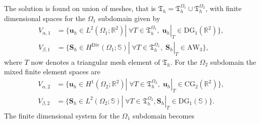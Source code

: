 \documentclass[11pt,a4paper]{article}
\newcommand{\bbR}{\mathbb{R}}
\newcommand{\bbS}{\mathbb{S}}
\DeclareMathOperator*{\Div}{Div}
\begin{document}
The solution is found on union of meshes, that is $\mathfrak{T}_h=\mathfrak{T}_h^{\Omega_1}\cup\mathfrak{T}_h^{\Omega_2}$, with finite dimensional spaces for the $\Omega_1$ subdomain given by
\begin{equation}
    \begin{split}
         V_{\alpha, 1} &= \{\bm{u}_h\in L^2(\Omega_1; \bbR^2)|\; \forall T\in\mathfrak{T}_h^{\Omega_1}, \; \bm{u}_h|_T\in \mathrm{DG}_1(\bbR^2)\}, \\
         V_{\beta, 1} &= \{\bm{S}_h\in H^{\Div}(\Omega_1; \bbS)|\; \forall T\in\mathfrak{T}_h^{\Omega_1}, \; \bm{S}_h|_T\in \mathrm{AW}_3\}, 
    \end{split}
\end{equation}
where $T$ now denotes a triangular mesh element of $\mathfrak{T}_h$. For the $\Omega_2$ subdomain the mixed finite element spaces are
\begin{equation}
    \begin{split}
        V_{\alpha, 2} &= \{\bm{u}_h\in H^1(\Omega_2; \bbR^2)|\; \forall T\in\mathfrak{T}_h^{\Omega_2},\; \bm{u}_h|_T\in \mathrm{CG}_2(\bbR^2)\}, \\
        V_{\beta, 2} &= \{\bm{S}_h\in L^2(\Omega_2; \bbS)|\; \forall T\in\mathfrak{T}_h^{\Omega_2}, \bm{S}_h|_T\in \mathrm{DG}_1(\bbS)\}.
    \end{split}
\end{equation}
The finite dimensional system for the $\Omega_1$ subdomain becomes
\end{document}
